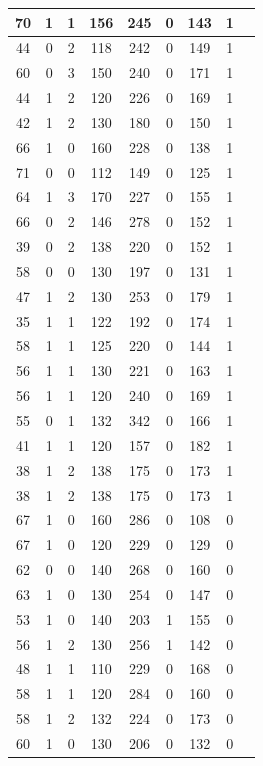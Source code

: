 \documentclass{article}
\begin{document}
\begin{longtable}{
|
c|c|c|c|c|c|c|c|c|}
\hline
70 & 1 & 1 & 156 & 245 & 0 & 143 & 1 \\
\hline
44 & 0 & 2 & 118 & 242 & 0 & 149 & 1 \\
\hline
60 & 0 & 3 & 150 & 240 & 0 & 171 & 1 \\
\hline
44 & 1 & 2 & 120 & 226 & 0 & 169 & 1 \\
\hline
42 & 1 & 2 & 130 & 180 & 0 & 150 & 1 \\
\hline
66 & 1 & 0 & 160 & 228 & 0 & 138 & 1 \\
\hline
71 & 0 & 0 & 112 & 149 & 0 & 125 & 1 \\
\hline
64 & 1 & 3 & 170 & 227 & 0 & 155 & 1 \\
\hline
66 & 0 & 2 & 146 & 278 & 0 & 152 & 1 \\
\hline
39 & 0 & 2 & 138 & 220 & 0 & 152 & 1 \\
\hline
58 & 0 & 0 & 130 & 197 & 0 & 131 & 1 \\
\hline
47 & 1 & 2 & 130 & 253 & 0 & 179 & 1 \\
\hline
35 & 1 & 1 & 122 & 192 & 0 & 174 & 1 \\
\hline
58 & 1 & 1 & 125 & 220 & 0 & 144 & 1 \\
\hline
56 & 1 & 1 & 130 & 221 & 0 & 163 & 1 \\
\hline
56 & 1 & 1 & 120 & 240 & 0 & 169 & 1 \\
\hline
55 & 0 & 1 & 132 & 342 & 0 & 166 & 1 \\
\hline
41 & 1 & 1 & 120 & 157 & 0 & 182 & 1 \\
\hline
38 & 1 & 2 & 138 & 175 & 0 & 173 & 1 \\
\hline
38 & 1 & 2 & 138 & 175 & 0 & 173 & 1 \\
\hline
67 & 1 & 0 & 160 & 286 & 0 & 108 & 0 \\
\hline
67 & 1 & 0 & 120 & 229 & 0 & 129 & 0 \\
\hline
62 & 0 & 0 & 140 & 268 & 0 & 160 & 0 \\
\hline
63 & 1 & 0 & 130 & 254 & 0 & 147 & 0 \\
\hline
53 & 1 & 0 & 140 & 203 & 1 & 155 & 0 \\
\hline
56 & 1 & 2 & 130 & 256 & 1 & 142 & 0 \\
\hline
48 & 1 & 1 & 110 & 229 & 0 & 168 & 0 \\
\hline
58 & 1 & 1 & 120 & 284 & 0 & 160 & 0 \\
\hline
58 & 1 & 2 & 132 & 224 & 0 & 173 & 0 \\
\hline
60 & 1 & 0 & 130 & 206 & 0 & 132 & 0 \\

\end{longtable}
\end{document}

